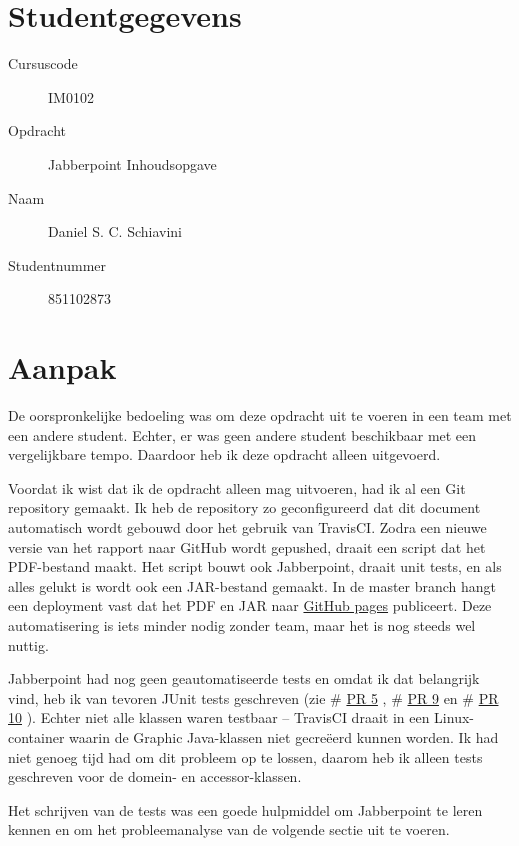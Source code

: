 \documentclass[a4paper]{article}
\makeatletter
\newcommand*{\PR}{\begingroup\@makeother\#\@PR}
\newcommand*{\@PR}[1]{%
  \href{https://github.com/DanielSchiavini/design-patterns-assignment/pull/#1}{PR #1}%
  \endgroup}
\makeatother
\begin{document}
\pagestyle{fancy}

\section*{Studentgegevens}
    \begin{description}
        \item [Cursuscode] IM0102
        \item [Opdracht] Jabberpoint Inhoudsopgave
        \item [Naam] Daniel S. C. Schiavini
        \item [Studentnummer] 851102873
    \end{description}

\section*{Aanpak}
    De oorspronkelijke bedoeling was om deze opdracht uit te voeren in een team met een andere student.
    Echter, er was geen andere student beschikbaar met een vergelijkbare tempo.
    Daardoor heb ik deze opdracht alleen uitgevoerd.

    Voordat ik wist dat ik de opdracht alleen mag uitvoeren, had ik al een Git repository gemaakt.
    Ik heb de repository zo geconfigureerd dat dit document automatisch wordt gebouwd door het gebruik van TravisCI.
    Zodra een nieuwe versie van het rapport naar GitHub wordt gepushed, draait een script dat het PDF-bestand maakt.
    Het script bouwt ook Jabberpoint, draait unit tests, en als alles gelukt is wordt ook een JAR-bestand gemaakt.
    In de master branch hangt een deployment vast dat het PDF en JAR naar \href{https://github.com/DanielSchiavini/design-patterns-assignment/tree/gh-pages}{GitHub pages} publiceert.
    Deze automatisering is iets minder nodig zonder team, maar het is nog steeds wel nuttig.

    Jabberpoint had nog geen geautomatiseerde tests en omdat ik dat belangrijk vind, heb ik van tevoren JUnit tests geschreven (zie \PR{5}, \PR{9} en \PR{10}).
    Echter niet alle klassen waren testbaar -- TravisCI draait in een Linux-container waarin de Graphic Java-klassen niet gecreëerd kunnen worden.
    Ik had niet genoeg tijd had om dit probleem op te lossen, daarom heb ik alleen tests geschreven voor de domein- en accessor-klassen.

    Het schrijven van de tests was een goede hulpmiddel om Jabberpoint te leren kennen en om het probleemanalyse van de volgende sectie uit te voeren.
\end{document}
